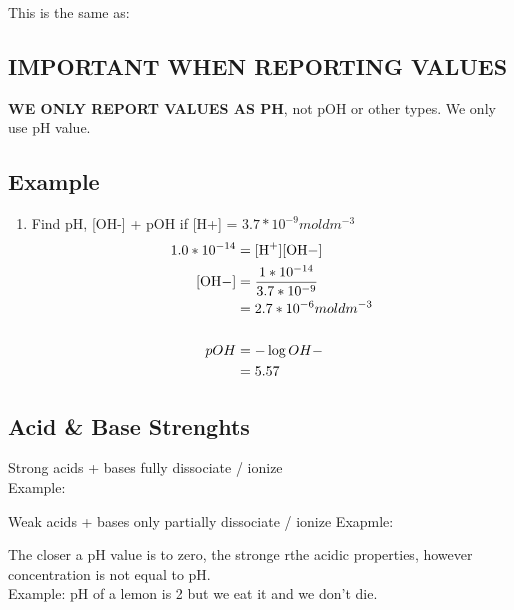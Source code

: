 \documentclass{article}
\begin{document}
This is the same as:

\subsection{IMPORTANT WHEN REPORTING VALUES}
\textbf{WE ONLY REPORT VALUES AS PH}, not pOH or other types. We only use pH value.


\subsection{Example}
\begin{enumerate}
    \item Find pH, [OH-] + pOH if [H+] = $3.7*10^{-9}moldm^{-3}$\begin{align*}
        1.0*10^{-14} &= \ce{[H+][OH-]}\\
        \ce{[OH-]} &= \frac{1*10^{-14}}{3.7*10^{-9}}\\
        &= 2.7*10^{-6}moldm^{-3}\\
        &\\
        pOH &= -\log{OH-}\\
        &= 5.57
    \end{align*}
\end{enumerate}

\subsection{Acid \& Base Strenghts}
Strong acids + bases fully dissociate / ionize\\
Example:  \\

Weak acids + bases only partially dissociate / ionize
Exapmle:  \\

The closer a pH value is to zero, the stronge rthe acidic properties, however concentration is not equal to pH. \\
Example: pH of a lemon is 2 but we eat it and we don't die.
\end{document}
